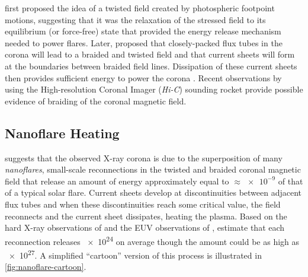 \citet{gold_magnetic_1964} first proposed the idea of a twisted field created by photospheric footpoint motions, suggesting that it was the relaxation of the stressed field to its equilibrium (or force-free) state that provided the energy release mechanism needed to power flares. Later, \citet{parker_topological_1972} proposed that closely-packed flux tubes in the corona will lead to a braided and twisted field and that current sheets will form at the boundaries between braided field lines. Dissipation of these current sheets then provides sufficient energy to power the corona \citep{parker_magnetic_1983,parker_magnetic_1983-1}. Recent observations by \citet{cirtain_energy_2013} using the High-resolution Coronal Imager (\textit{Hi-C}) sounding rocket provide possible evidence of braiding of the coronal magnetic field.

\subsection{Nanoflare Heating}\label{sec:nanoflares}

\citet{parker_nanoflares_1988} suggests that the observed X-ray corona is due to the superposition of many \textit{nanoflares}, small-scale reconnections in the twisted and braided coronal magnetic field that release an amount of energy approximately equal to $\approx\num{e-9}$ of that of a typical solar flare. Current sheets develop at discontinuities between adjacent flux tubes and when these discontinuities reach some critical value, the field reconnects and the current sheet dissipates, heating the plasma. Based on the hard X-ray observations of \citet{lin_solar_1984} and the EUV observations of \citet{brueckner_observations_1983}, \citeauthor{parker_nanoflares_1988} estimate that each reconnection releases \SI{e24}{\erg} on average though the amount could be as high as \SI{e27}{\erg}. A simplified ``cartoon'' version of this process is illustrated in \autoref{fig:nanoflare-cartoon}.

